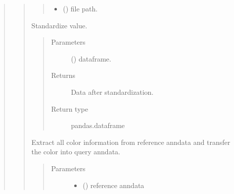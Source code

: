 \documentclass[letterpaper,10pt,english]{sphinxmanual}
\begin{document}
\begin{quote}
\begin{quote}
\begin{fulllineitems}
\begin{quote}
\begin{description}
\begin{itemize}
\item {} 
 () \textendash{} file path.

\end{itemize}

\end{description}\end{quote}

\end{fulllineitems}


\begin{fulllineitems}
\label{\detokenize{modules/celloracle.utility:celloracle.utility.standard}}
Standardize value.
\begin{quote}\begin{description}
\item[{Parameters}] \leavevmode
{} () \textendash{} dataframe.

\item[{Returns}] \leavevmode
Data after standardization.

\item[{Return type}] \leavevmode
pandas.dataframe

\end{description}\end{quote}

\end{fulllineitems}


\begin{fulllineitems}
\label{\detokenize{modules/celloracle.utility:celloracle.utility.transfer_all_colors_between_anndata}}
Extract all color information from reference anndata and transfer the color into query anndata.
\begin{quote}\begin{description}
\item[{Parameters}] \leavevmode\begin{itemize}
\item {} 
 () \textendash{} reference anndata


\end{itemize}
\end{description}
\end{quote}
\end{fulllineitems}
\end{quote}
\end{quote}
\end{document}
